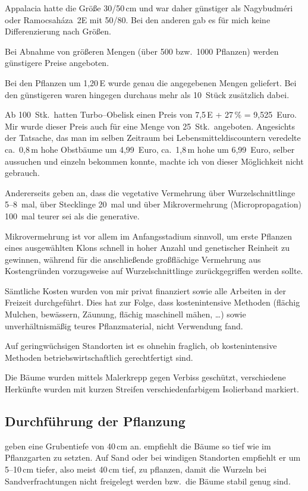 \documentclass[twocolumn]{scrartcl}
\begin{document}
Appalacia hatte die Größe 30/50\,cm und war daher günstiger als
Nagybudméri oder Ramocsaháza~2E mit 50/80. Bei den anderen gab es für
mich keine Differenzierung nach Größen.

Bei Abnahme von größeren Mengen (über 500 bzw.\ 1000 Pflanzen) werden
günstigere Preise angeboten.

Bei den Pflanzen um 1,20\,E wurde genau die angegebenen Mengen
geliefert.  Bei den günstigeren waren hingegen durchaus mehr als
10~Stück zusätzlich dabei.

Ab 100~Stk.\ hatten Turbo--Obelisk einen Preis von 7,5\,E + 27\,\% =
9,525~Euro. Mir wurde dieser Preis auch für eine Menge von
25~Stk.\ angeboten. Angesichts der Tatsache, das man im selben
Zeitraum bei Lebensmitteldiscountern veredelte ca.\ 0,8\,m hohe
Obstbäume um 4,99~Euro, ca.\ 1,8\,m hohe um 6,99~Euro, selber
aussuchen und einzeln bekommen konnte, machte ich von dieser
Möglichkeit nicht gebrauch.

Andererseits geben
\citet{keresztesi1988robinieLw,redei2005robinieVermehrung} an, dass
die vegetative Vermehrung über Wurzelschnittlinge 5--8~mal, über
Stecklinge 20~mal und über Mikrovermehrung (Micropropagation) 100~mal
teurer sei als die generative.

Mikrovermehrung ist vor allem im Anfangsstadium sinnvoll, um erste
Pflanzen eines ausgewählten Klons schnell in hoher Anzahl und
genetischer Reinheit zu gewinnen, während für die anschließende
großflächige Vermehrung aus Kostengründen vorzugsweise auf
Wurzelschnittlinge zurückgegriffen werden sollte.

Sämtliche Kosten wurden von mir privat finanziert sowie alle Arbeiten
in der Freizeit durchgeführt. Dies hat zur Folge, dass kostenintensive
Methoden (flächig Mulchen, bewässern, Zäunung, flächig maschinell
mähen, \dots) sowie unverhältnismäßig teures Pflanzmaterial, nicht
Verwendung fand.

Auf geringwüchsigen Standorten ist es ohnehin fraglich, ob
kostenintensive Methoden betriebswirtschaftlich gerechtfertigt sind.

Die Bäume wurden mittels Malerkrepp gegen Verbiss geschützt,
verschiedene Herkünfte wurden mit kurzen Streifen verschiedenfarbigem
Isolierband markiert.

\subsection{Durchführung der Pflanzung}

\citet{ciuvat2022robinieRumaenien} geben eine Grubentiefe von 40\,cm
an. \citet[S.~164--165, 173]{vadas1911robinie} empfiehlt die Bäume so
tief wie im Pflanzgarten zu setzten. Auf Sand oder bei windigen
Standorten empfiehlt er um 5--10\,cm tiefer, also meist 40\,cm tief,
zu pflanzen, damit die Wurzeln bei Sandverfrachtungen nicht freigelegt
werden bzw.\ die Bäume stabil genug sind.
\end{document}

